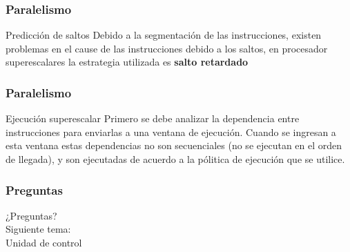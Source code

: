 \documentclass{beamer}
\begin{document}
\begin{frame}
	\frametitle{Paralelismo}
	\begin{block}{Predicción de saltos}
	Debido a la segmentación de las instrucciones, existen problemas en el cause de las instrucciones debido a los saltos, en procesador superescalares la estrategia utilizada es \textbf{salto retardado}
	\end{block}		 		
\end{frame}


\begin{frame}
	\frametitle{Paralelismo}
	\begin{block}{Ejecución superescalar}
	Primero se debe analizar la dependencia entre instrucciones para enviarlas a una ventana de ejecución. Cuando se ingresan a esta ventana estas dependencias no son secuenciales (no se ejecutan en el orden de llegada), y son ejecutadas de acuerdo a la pólitica de ejecución que se utilice.
	\end{block}		 		
\end{frame}


\begin{frame}
	\frametitle{Preguntas}
	\vfill
	\begin{center}
	¿Preguntas?\\
	\vfill
	Siguiente tema: \\
	Unidad de control
	\end{center}
\end{frame}
\end{document}

